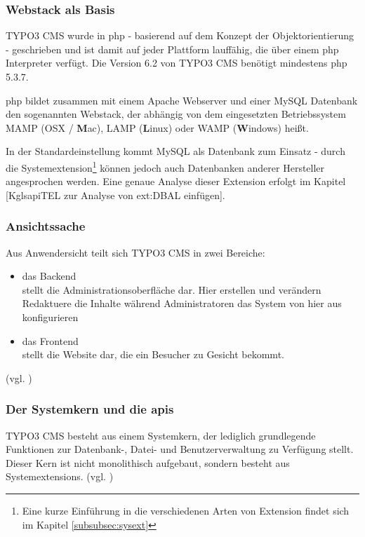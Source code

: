 \subsubsection{Webstack als Basis}

TYPO3 CMS wurde in \gls{php} - basierend auf dem Konzept der Objektorientierung - geschrieben und ist damit auf jeder Plattform lauffähig, die über einem \gls{php} Interpreter verfügt. Die Version 6.2 von TYPO3 CMS benötigt mindestens \gls{php} 5.3.7.

\gls{php} bildet zusammen mit einem Apache Webserver und einer MySQL Datenbank den sogenannten Webstack, der abhängig von dem eingesetzten Betriebssystem MAMP (OSX / {\bfseries M}ac), LAMP ({\bfseries L}inux) oder WAMP ({\bfseries W}indows) heißt.

In der Standardeinstellung kommt MySQL als Datenbank zum Einsatz - durch die Systemextension\footnote{Eine kurze Einführung in die verschiedenen Arten von Extension findet sich im Kapitel \ref{subsubsec:sysext}} können jedoch auch Datenbanken anderer Hersteller angesprochen werden. Eine genaue Analyse dieser Extension erfolgt im Kapitel [Kgls{api}TEL zur Analyse von ext:DBAL einfügen].

\subsubsection{Ansichtssache}
Aus Anwendersicht teilt sich TYPO3 CMS in zwei Bereiche:

\begin{itemize}
	\item das Backend\\
		stellt die Administrationsoberfläche dar. Hier erstellen und verändern Redaktuere die Inhalte während Administratoren das System von hier aus konfigurieren
	\item das Frontend\\
		stellt die Website dar, die ein Besucher zu Gesicht bekommt.
\end{itemize}
(vgl. \cite[S. 5]{book:dulepovTypo32008})



\subsubsection{Der Systemkern und die \gls{api}s}
TYPO3 CMS besteht aus einem Systemkern, der lediglich grundlegende Funktionen zur Datenbank-, Datei- und Benutzerverwaltung zu Verfügung stellt. Dieser Kern ist nicht monolithisch aufgebaut, sondern besteht aus Systemextensions. (vgl. \cite[S. 32]{book:laborenzTypo32006})

